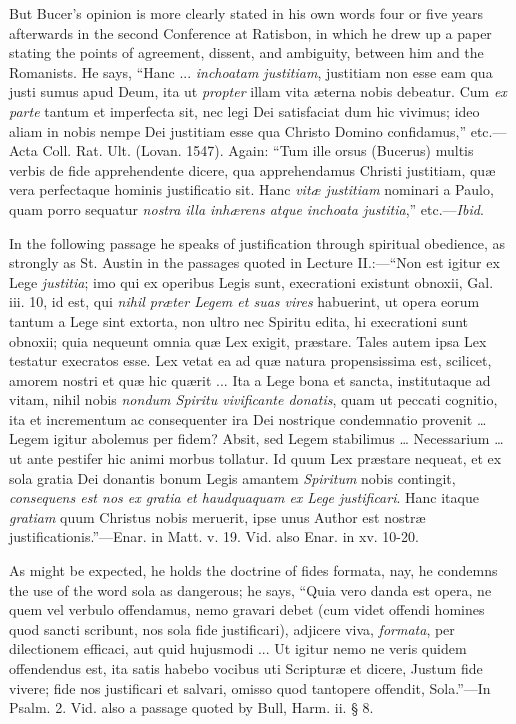 But Bucer's opinion is more clearly stated in his own words four or
five years afterwards in the second Conference at Ratisbon, in which
he drew up a paper stating the points of agreement, dissent, and
ambiguity, between him and the Romanists. He says, ``Hanc ... \emph{inchoatam
justitiam}, justitiam non esse eam qua justi sumus apud Deum, ita
ut \emph{propter} illam vita æterna nobis debeatur. Cum \emph{ex parte}
tantum et imperfecta sit, nec legi Dei satisfaciat dum hic vivimus;
ideo aliam in nobis nempe Dei justitiam esse qua Christo Domino
confidamus,'' etc.—Acta Coll. Rat. Ult. (Lovan. 1547). Again:
``Tum ille orsus (Bucerus) multis verbis de fide apprehendente
dicere, qua apprehendamus Christi justitiam, quæ vera perfectaque
hominis justificatio sit. Hanc \emph{vitæ justitiam} nominari a
Paulo, quam porro sequatur \emph{nostra illa inhærens atque inchoata
justitia},'' etc.—\emph{Ibid}.

In the following passage he speaks of justification through
spiritual obedience, as strongly as St. Austin in the passages quoted
in Lecture II.:—``Non est igitur ex Lege \emph{justitia}; imo
qui ex operibus Legis sunt, execrationi existunt obnoxii, Gal. iii.
10, id est, qui \emph{nihil præter Legem et suas vires} habuerint, ut
opera eorum tantum a Lege sint extorta, non ultro nec Spiritu edita,
hi execrationi sunt obnoxii; quia nequeunt omnia quæ Lex exigit,
præstare. Tales autem ipsa Lex testatur execratos esse. Lex vetat ea
ad quæ natura propensissima est, scilicet, amorem nostri et quæ hic
quærit ... Ita a Lege bona et sancta, institutaque ad vitam, nihil
nobis \emph{nondum Spiritu vivificante donatis}, quam ut peccati
cognitio, ita et incrementum ac consequenter ira Dei nostrique
condemnatio provenit … Legem igitur abolemus per fidem? Absit, sed
Legem stabilimus … Necessarium … ut ante pestifer hic animi morbus
tollatur. Id quum Lex præstare nequeat, et ex sola gratia Dei
donantis bonum Legis amantem \emph{Spiritum} nobis contingit, \emph{consequens
est nos ex gratia et haudquaquam ex Lege justificari}. Hanc itaque \emph{gratiam} quum Christus nobis meruerit, ipse unus Author est nostræ
justificationis.''—Enar. in Matt. v. 19. Vid. also Enar. in xv.
10-20.

As might be expected, he holds the doctrine of fides formata, nay,
he condemns the use of the word sola as dangerous; he says, ``Quia
vero danda est opera, ne quem vel verbulo offendamus, nemo gravari
debet (cum videt offendi homines quod sancti scribunt, nos sola fide
justificari), adjicere viva, \emph{formata}, per dilectionem efficaci,
aut quid hujusmodi ... Ut igitur nemo ne veris quidem offendendus est,
ita satis habebo vocibus uti Scripturæ et dicere, Justum fide vivere;
fide nos justificari et salvari, omisso quod tantopere offendit, Sola.''—In
Psalm. 2. Vid. also a passage quoted by Bull, Harm. ii. § 8.

